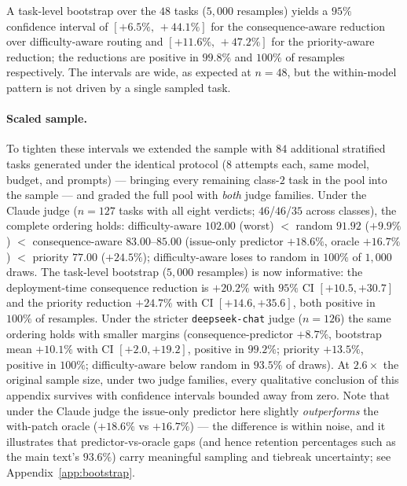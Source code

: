 \documentclass{article}
\begin{document}
A task-level bootstrap over the $48$ tasks ($5{,}000$ resamples)
yields a $95\%$ confidence interval of $[+6.5\%,\,+44.1\%]$ for the
consequence-aware reduction over difficulty-aware routing and
$[+11.6\%,\,+47.2\%]$ for the priority-aware reduction; the
reductions are positive in $99.8\%$ and $100\%$ of resamples
respectively. The intervals are wide, as expected at $n{=}48$, but
the within-model pattern is not driven by a single sampled task.

\paragraph{Scaled sample.} To tighten these intervals we extended
the sample with $84$ additional stratified tasks generated under the
identical protocol ($8$ attempts each, same model, budget, and
prompts) --- bringing every remaining class-$2$ task in the pool into
the sample --- and graded the full pool with \emph{both} judge
families. Under the Claude judge ($n{=}127$ tasks with all eight
verdicts; $46$/$46$/$35$ across classes), the complete ordering
holds: difficulty-aware $102.00$ (worst) $<$ random $91.92$
($+9.9\%$) $<$ consequence-aware $83.00$--$85.00$ (issue-only
predictor $+18.6\%$, oracle $+16.7\%$) $<$ priority $77.00$
($+24.5\%$); difficulty-aware loses to random in $100\%$ of
$1{,}000$ draws. The task-level bootstrap ($5{,}000$ resamples) is
now informative: the deployment-time consequence reduction is
$+20.2\%$ with $95\%$ CI $[+10.5, +30.7]$ and the priority
reduction $+24.7\%$ with CI $[+14.6, +35.6]$, both positive in
$100\%$ of resamples. Under the stricter \texttt{deepseek-chat}
judge ($n{=}126$) the same ordering holds with smaller margins
(consequence-predictor $+8.7\%$, bootstrap mean $+10.1\%$ with CI
$[+2.0, +19.2]$, positive in
$99.2\%$; priority $+13.5\%$, positive in $100\%$; difficulty-aware
below random in $93.5\%$ of draws). At $2.6\times$ the original
sample size, under two judge families, every qualitative conclusion
of this appendix survives with confidence intervals bounded away
from zero. Note that under the Claude judge the issue-only predictor
here slightly \emph{outperforms} the with-patch oracle ($+18.6\%$ vs
$+16.7\%$) --- the difference is within noise, and it illustrates
that predictor-vs-oracle gaps (and hence retention percentages such
as the main text's $93.6\%$) carry meaningful sampling and tiebreak
uncertainty; see Appendix~\ref{app:bootstrap}.
\end{document}
